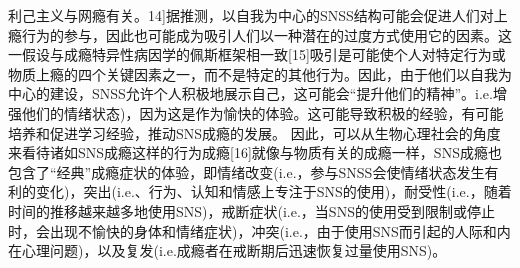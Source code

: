 利己主义与网瘾有关。14]据推测，以自我为中心的SNSS结构可能会促进人们对上瘾行为的参与，因此也可能成为吸引人们以一种潜在的过度方式使用它的因素。这一假设与成瘾特异性病因学的佩斯框架相一致[15]吸引是可能使个人对特定行为或物质上瘾的四个关键因素之一，而不是特定的其他行为。因此，由于他们以自我为中心的建设，SNSS允许个人积极地展示自己，这可能会“提升他们的精神”。i.e.增强他们的情绪状态)，因为这是作为愉快的体验。这可能导致积极的经验，有可能培养和促进学习经验，推动SNS成瘾的发展。
因此，可以从生物心理社会的角度来看待诸如SNS成瘾这样的行为成瘾[16]就像与物质有关的成瘾一样，SNS成瘾也包含了“经典”成瘾症状的体验，即情绪改变(i.e.，参与SNSS会使情绪状态发生有利的变化)，突出(i.e.、行为、认知和情感上专注于SNS的使用)，耐受性(i.e.，随着时间的推移越来越多地使用SNS)，戒断症状(i.e.，当SNS的使用受到限制或停止时，会出现不愉快的身体和情绪症状)，冲突(i.e.，由于使用SNS而引起的人际和内在心理问题)，以及复发(i.e.成瘾者在戒断期后迅速恢复过量使用SNS)。

